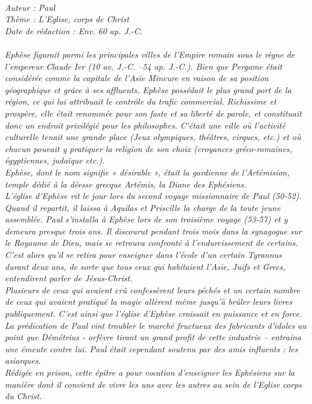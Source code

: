 \BFont
\noindent\hrulefill
{\footnotesize
\textit{
\bigskip
{\centering{}
\\Auteur : Paul
\\Thème : L'Eglise, corps de Christ
\\Date de rédaction : Env. 60 ap. J.-C.\\}
}
\textit{
\\Ephèse figurait parmi les principales villes de l’Empire romain sous le règne de l’empereur Claude Ier (10 av. J.-C. –54 ap. J.-C.). Bien que Pergame était considérée comme la capitale de l’Asie Mineure en raison de sa position géographique et grâce à ses affluents, Ephèse possédait le plus grand port de la région, ce qui lui attribuait le contrôle du trafic commercial. Richissime et prospère, elle était renommée pour son faste et sa liberté de parole, et constituait donc un endroit privilégié pour les philosophes. C’était une ville où l’activité culturelle tenait une grande place (Jeux olympiques, théâtres, cirques, etc.) et où chacun pouvait y pratiquer la religion de son choix (croyances gréco-romaines, égyptiennes, judaïque etc.).
\\Ephèse, dont le nom signifie « désirable », était la gardienne de l’Artémision, temple dédié à la déesse grecque Artémis,
la Diane des Ephésiens.
\\L’église d’Ephèse vit le jour lors du second voyage missionnaire de Paul (50-52). Quand il repartit, il laissa à Aquilas et Priscille la charge de la toute jeune assemblée. Paul s’installa à Ephèse lors de son troisième voyage (53-57) et y demeura presque trois ans. Il discourut pendant trois mois  dans la synagogue sur le Royaume de Dieu, mais se retrouva confronté à l’endurcissement de certains. C’est alors qu’il se retira pour enseigner dans l’école d’un certain Tyrannus durant deux ans, de sorte que tous ceux qui habitaient l’Asie, Juifs et Grecs, entendirent parler de Jésus-Christ.
\\Plusieurs de ceux qui avaient crû confessèrent leurs péchés et un certain nombre de ceux qui avaient pratiqué la magie allèrent même jusqu’à brûler leurs livres publiquement. C’est ainsi que l’église d’Ephèse croissait en puissance et en force. La prédication de Paul vint troubler le marché fructueux des fabricants d’idoles au point que Démétrius - orfèvre tirant un grand profit de cette industrie – entraina une émeute contre lui. Paul était cependant soutenu par des amis influents : les asiarques.
\\Rédigée en prison, cette épître a pour vocation d’enseigner les Ephésiens sur la manière dont il convient de vivre les uns avec les autres au sein de l’Eglise corps du Christ.\bigskip
}
}
